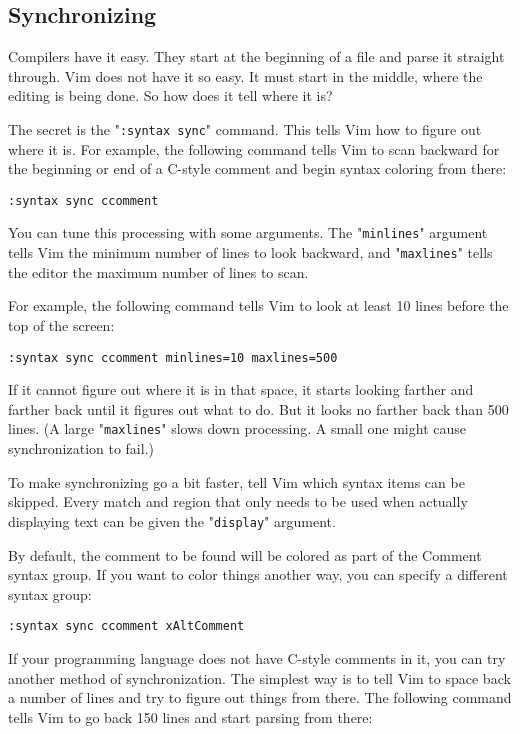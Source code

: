 \subsection{Synchronizing}
Compilers have it easy.
They start at the beginning of a file and parse it straight through.
Vim does not have it so easy.
It must start in the middle, where the editing is being done.
So how does it tell where it is?

The secret is the "\texttt{:syntax sync}" command.
This tells Vim how to figure out where it is.
For example, the following command tells Vim to scan backward for the beginning or end of a C-style comment and begin syntax coloring from there:

\begin{Verbatim}[samepage=true]
 :syntax sync ccomment
\end{Verbatim}

You can tune this processing with some arguments.
The "\texttt{minlines}" argument tells Vim the minimum number of lines to look backward, and "\texttt{maxlines}" tells the editor the maximum number of lines to scan.

For example, the following command tells Vim to look at least 10 lines before the top of the screen:

\begin{Verbatim}[samepage=true]
 :syntax sync ccomment minlines=10 maxlines=500
\end{Verbatim}

If it cannot figure out where it is in that space, it starts looking farther and farther back until it figures out what to do.
But it looks no farther back than 500 lines.
(A large "\texttt{maxlines}" slows down processing.
A small one might cause synchronization to fail.)

To make synchronizing go a bit faster, tell Vim which syntax items can be skipped.
Every match and region that only needs to be used when actually displaying text can be given the "\texttt{display}" argument.

By default, the comment to be found will be colored as part of the Comment syntax group.
If you want to color things another way, you can specify a different syntax group:

\begin{Verbatim}[samepage=true]
 :syntax sync ccomment xAltComment
\end{Verbatim}

If your programming language does not have C-style comments in it, you can try another method of synchronization.
The simplest way is to tell Vim to space back a number of lines and try to figure out things from there.
The following command tells Vim to go back 150 lines and start parsing from there:


